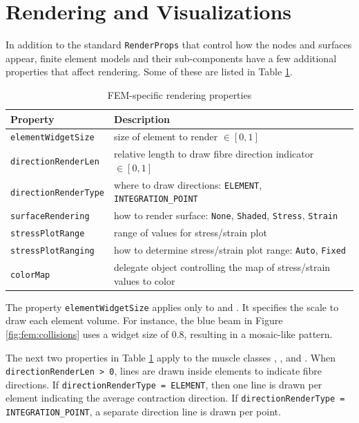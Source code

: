 \section{Rendering and Visualizations}
\label{sec:fem:rendering}

In addition to the standard {\tt RenderProps} that control how the
nodes and surfaces appear, finite element models and their sub-components
have a few additional properties that affect rendering.  Some of these
are listed in Table \ref{tbl:fem:rendering}.

\begin{table}[ht]
	\centering
	\caption{FEM-specific rendering properties} \label{tbl:fem:rendering}
	\begin{tabular}{lp{}}
		\hline\hline
		Property & Description\\
		\hline
	   {\tt elementWidgetSize} & size of element to render $\in [0,1]$\\
	   {\tt directionRenderLen} & relative length to draw fibre direction indicator $\in [0, 1]$\\
	   {\tt directionRenderType} & where to draw directions: {\tt ELEMENT}, {\tt INTEGRATION\_POINT}\\
	   {\tt surfaceRendering} & how to render surface: {\tt None}, {\tt Shaded}, {\tt Stress}, {\tt Strain}\\
	   {\tt stressPlotRange} & range of values for stress/strain plot\\
	   {\tt stressPlotRanging} & how to determine stress/strain plot range: {\tt Auto}, {\tt Fixed}\\
	   {\tt colorMap} & delegate object controlling the map of stress/strain values to color\\
	   \hline
	\end{tabular}
\end{table}

The property {\tt elementWidgetSize} applies only to 
 and
.  It specifies the scale to
draw each element volume.  For instance, the blue beam in Figure \ref{fig:fem:collisions}
uses a widget size of 0.8, resulting in a mosaic-like pattern.

The next two properties in Table \ref{tbl:fem:rendering} apply to the muscle classes 
, 
, and
.
When {\tt directionRenderLen > 0}, lines are drawn inside elements to indicate fibre
directions.  If {\tt directionRenderType = ELEMENT}, then one line is drawn per
element indicating the average contraction direction.  If 
{\tt directionRenderType = INTEGRATION\_POINT}, a separate direction line is drawn 
per point.


